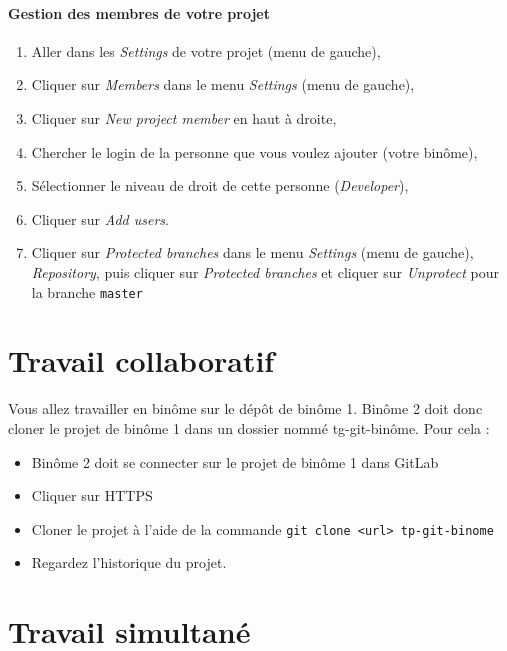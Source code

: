 \documentclass[final, a4paper, openbib, ]{article}
\begin{document}
\paragraph{Gestion des membres de votre projet}
\begin{enumerate}
\item Aller dans les \textit{Settings} de votre projet (menu de gauche),
\item Cliquer sur \textit{Members} dans le menu \textit{Settings} (menu de gauche),
\item Cliquer sur \textit{New project member} en haut à droite,
\item Chercher le login de la personne que vous voulez ajouter (votre binôme),
\item Sélectionner le niveau de droit de cette personne (\textit{Developer}),
\item Cliquer sur \textit{Add users}.
\item Cliquer sur \textit{Protected branches} dans le menu \textit{Settings} (menu de gauche), \textit{Repository},
puis cliquer sur \textit{Protected branches} et cliquer sur \textit{Unprotect} pour la branche \texttt{master}
\end{enumerate}


\section{Travail collaboratif}


Vous allez travailler en binôme sur le dépôt de binôme 1. 
Binôme 2 doit donc cloner le projet de binôme 1 dans un dossier nommé tg-git-binôme.
Pour cela :
\begin{itemize}
\item Binôme 2 doit se connecter sur le projet de binôme 1 dans GitLab %
\item Cliquer sur HTTPS
\item Cloner le projet à l'aide de la commande \texttt{git clone <url> tp-git-binome}
\item Regardez l'historique du projet.
\end{itemize}

\section{Travail simultané}
\end{document}

